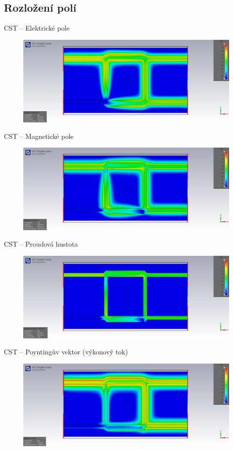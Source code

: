 \documentclass[aspectratio=169, 11pt, hyperref={unicode}]{beamer}
\begin{document}
\subsection{Rozložení polí}
\begin{frame}{CST -- Elektrické pole}
	\begin{figure}[!ht]
		\centering
		\includegraphics[width=.8\textwidth]{src/CST_E-field_f12-8.png}
	\end{figure}
\end{frame}
\begin{frame}{CST -- Magnetické pole}
	\begin{figure}[!ht]
		\centering
		\includegraphics[width=.8\textwidth]{src/CST_H-field_f12-8.png}
	\end{figure}
\end{frame}
\begin{frame}{CST -- Proudová hustota}
	\begin{figure}[!ht]
		\centering
		\includegraphics[width=.8\textwidth]{src/CST_J-current_f12-8.png}
	\end{figure}
\end{frame}
\begin{frame}{CST -- Poyntingův vektor (výkonový tok)}
	\begin{figure}[!ht]
		\centering
		\includegraphics[width=.8\textwidth]{src/CST_power_f12-8.png}
	\end{figure}
\end{frame}
\end{document}
